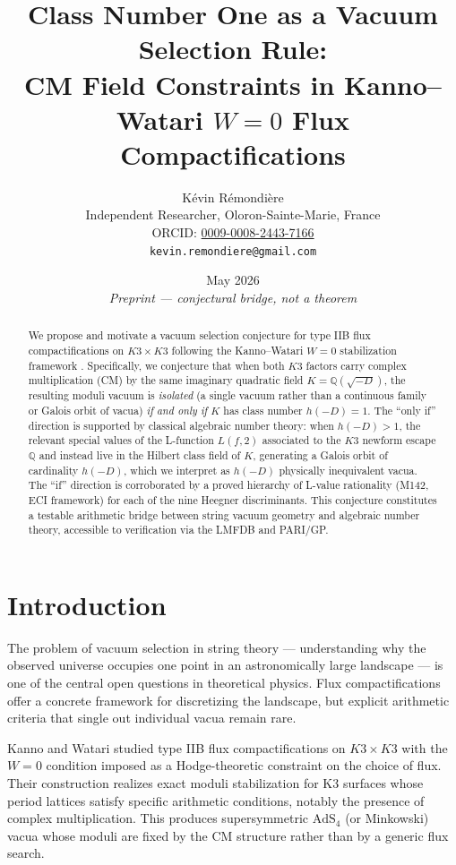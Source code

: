 \documentclass[12pt,a4paper]{article}
\title{Class Number One as a Vacuum Selection Rule:\\
CM Field Constraints in Kanno--Watari $W=0$ Flux Compactifications}
\author{K\'evin R\'emondi\`ere\\
\small Independent Researcher, Oloron-Sainte-Marie, France\\
\small ORCID: \href{https://orcid.org/0009-0008-2443-7166}{0009-0008-2443-7166}\\
\small \texttt{kevin.remondiere@gmail.com}}
\date{May 2026 \\ \small\textit{Preprint — conjectural bridge, not a theorem}}
\theoremstyle{plain}
\theoremstyle{definition}
\newcommand{\Q}{\mathbb{Q}}
\begin{document}
\maketitle

\begin{abstract}
We propose and motivate a vacuum selection conjecture for type IIB flux
compactifications on $K3 \times K3$ following the Kanno--Watari $W=0$
stabilization framework \cite{KannoWatari2024}. Specifically, we conjecture that
when both $K3$ factors carry complex multiplication (CM) by the same imaginary
quadratic field $K = \Q(\sqrt{-D})$, the resulting moduli vacuum is
\emph{isolated} (a single vacuum rather than a continuous family or Galois
orbit of vacua) \emph{if and only if} $K$ has class number $h(-D) = 1$.
The ``only if'' direction is supported by classical algebraic number theory:
when $h(-D) > 1$, the relevant special values of the L-function $L(f, 2)$
associated to the $K3$ newform escape $\Q$ and instead live in the Hilbert
class field of $K$, generating a Galois orbit of cardinality $h(-D)$,
which we interpret as $h(-D)$ physically inequivalent vacua. The ``if''
direction is corroborated by a proved hierarchy of L-value rationality
(M142, ECI framework) for each of the nine Heegner discriminants. This
conjecture constitutes a testable arithmetic bridge between string vacuum
geometry and algebraic number theory, accessible to verification via the
LMFDB and PARI/GP.
\end{abstract}

\tableofcontents

\newpage

\section{Introduction}
\label{sec:intro}

The problem of vacuum selection in string theory --- understanding why the
observed universe occupies one point in an astronomically large landscape ---
is one of the central open questions in theoretical physics. Flux
compactifications offer a concrete framework for discretizing the landscape,
but explicit arithmetic criteria that single out individual vacua remain rare.

Kanno and Watari \cite{KannoWatari2024} studied type IIB flux
compactifications on $K3 \times K3$ with the $W=0$ condition imposed as a
Hodge-theoretic constraint on the choice of flux. Their construction realizes
exact moduli stabilization for K3 surfaces whose period lattices satisfy
specific arithmetic conditions, notably the presence of complex multiplication.
This produces supersymmetric $\mathrm{AdS}_4$ (or Minkowski) vacua whose
moduli are fixed by the CM structure rather than by a generic flux search.
\end{document}
